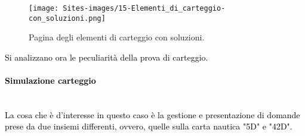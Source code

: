 \newpage

\begin{minipage}{\textwidth}
	\begin{figure}[H]
		\begin{center}
			\texttt{[image: Sites-images/15-Elementi\_di\_carteggio-con\_soluzioni.png]}
			\caption{Pagina degli elementi di carteggio con soluzioni.}
		\end{center}
	\end{figure}
\end{minipage}

\textcolor{black}{Si analizzano ora le peculiarità della prova di carteggio.}\\

\paragraph{\textcolor{black}{Simulazione carteggio}}\leavevmode\\

\textcolor{black}{La cosa che è d'interesse in questo caso è la gestione e presentazione di domande prese da due insiemi differenti, ovvero, quelle sulla carta nautica "5D" e "42D".}\\ 

